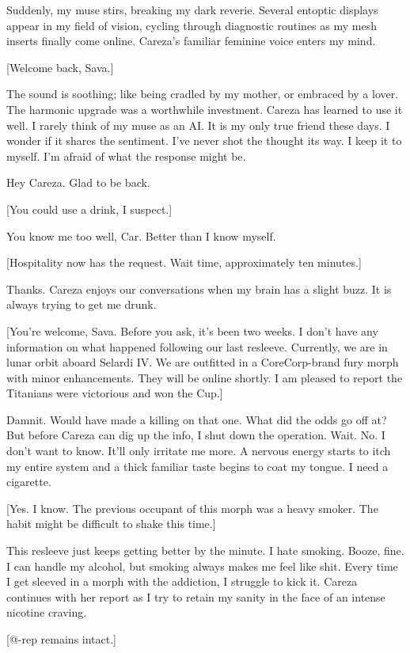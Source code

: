 Suddenly, my muse stirs, breaking my dark reverie. Several entoptic displays appear in my field of vision, cycling through diagnostic routines as my mesh inserts finally come online. Careza's familiar feminine voice enters my mind. 

[Welcome back, Sava.] 

The sound is soothing; like being cradled by my mother, or embraced by a lover. The harmonic upgrade was a worthwhile investment. Careza has learned to use it well. I rarely think of my muse as an AI. It is my only true friend these days. I wonder if it shares the sentiment. I've never shot the thought its way. I keep it to myself. I'm afraid of what the response might be. 

Hey Careza. Glad to be back. 

[You could use a drink, I suspect.] 

You know me too well, Car. Better than I know myself. 

[Hospitality now has the request. Wait time, approximately ten minutes.] 

Thanks. Careza enjoys our conversations when my brain has a slight buzz. It is always trying to get me drunk. 

[You're welcome, Sava. Before you ask, it's been two weeks. I don't have any information on what happened following our last resleeve. Currently, we are in lunar orbit aboard Selardi IV. We are outfitted in a CoreCorp-brand fury morph with minor enhancements. They will be online shortly. I am pleased to report the Titanians were victorious and won the Cup.] 

Damnit. Would have made a killing on that one. What did the odds go off at? But before Careza can dig up the info, I shut down the operation. Wait. No. I don't want to know. It'll only irritate me more. A nervous energy starts to itch my entire system and a thick familiar taste begins to coat my tongue. I need a cigarette. 

[Yes. I know. The previous occupant of this morph was a heavy smoker. The habit might be difficult to shake this time.] 

This resleeve just keeps getting better by the minute. I hate smoking. Booze, fine. I can handle my alcohol, but smoking always makes me feel like shit. Every time I get sleeved in a morph with the addiction, I struggle to kick it. Careza continues with her report as I try to retain my sanity in the face of an intense nicotine craving. 

[@-rep remains intact.] 

